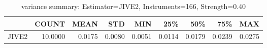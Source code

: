 \begin{table}[ht]
\centering
\caption{variance summary: Estimator=JIVE2, Instruments=166, Strength=0.40}
\begin{tabular}{lrrrrrrrr}
\toprule
 & COUNT & MEAN & STD & MIN & 25\% & 50\% & 75\% & MAX \\
\midrule
JIVE2 & 10.0000 & 0.0175 & 0.0080 & 0.0051 & 0.0114 & 0.0179 & 0.0239 & 0.0275 \\
\bottomrule
\end{tabular}
\end{table}
